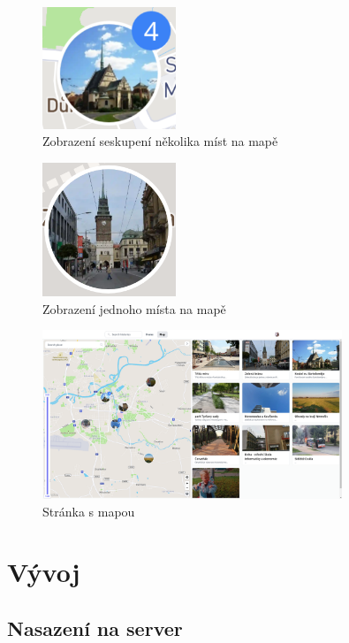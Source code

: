 \documentclass[12pt, a4paper,
 twoside,        %
 openright
]{report}
\begin{document}
\begin{figure}[h]
	\centering
	\includegraphics[width=4cm]{images/places_cluster.png}
	\caption{Zobrazení seskupení několika míst na mapě}\label{figure:clusterOnMap}
\end{figure}
\begin{figure}[h]
	\centering
	\includegraphics[width=4cm]{images/place.png}
	\caption{Zobrazení jednoho místa na mapě}\label{figure:onePlaceOnMap}
\end{figure}

\begin{figure}[h]
	\centering
	\includegraphics[width=0.8\textwidth]{images/map_page.png}
	\caption{Stránka s mapou}\label{figure:mapPagePreview}
\end{figure}



\chapter{Vývoj}
\section{Nasazení na server}
\end{document}
